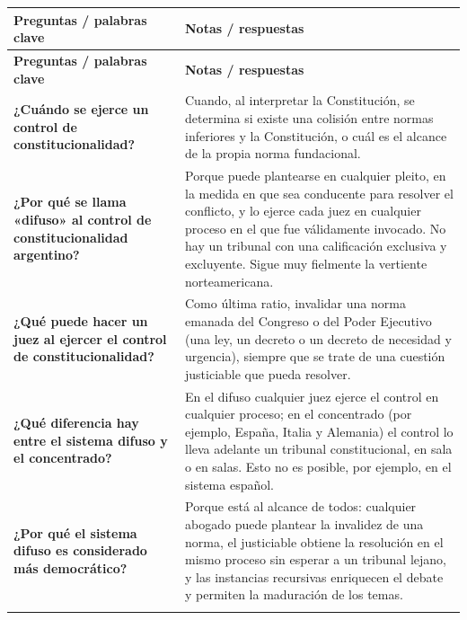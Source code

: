 \documentclass[12pt,oneside]{book}
\begin{document}
\begin{longtable}{@{}>{\RaggedRight\arraybackslash}p{}>{\RaggedRight\arraybackslash}p{}@{}}
\toprule
\textbf{Preguntas / palabras clave} & \textbf{Notas / respuestas} \\
\midrule
\endfirsthead
\toprule
\textbf{Preguntas / palabras clave} & \textbf{Notas / respuestas} \\
\midrule
\endhead
\bottomrule
\endlastfoot

\textbf{¿Cuándo se ejerce un control de constitucionalidad?} &
Cuando, al interpretar la Constitución, se determina si existe una colisión entre normas inferiores y la Constitución, o cuál es el alcance de la propia norma fundacional. \\
\addlinespace[0.3em]\cmidrule[0.2pt]{1-2}\addlinespace[0.3em]

\textbf{¿Por qué se llama «difuso» al control de constitucionalidad argentino?} &
Porque puede plantearse en cualquier pleito, en la medida en que sea conducente para resolver el conflicto, y lo ejerce cada juez en cualquier proceso en el que fue válidamente invocado. No hay un tribunal con una calificación exclusiva y excluyente. Sigue muy fielmente la vertiente norteamericana. \\
\addlinespace[0.3em]\cmidrule[0.2pt]{1-2}\addlinespace[0.3em]

\textbf{¿Qué puede hacer un juez al ejercer el control de constitucionalidad?} &
Como última ratio, invalidar una norma emanada del Congreso o del Poder Ejecutivo (una ley, un decreto o un decreto de necesidad y urgencia), siempre que se trate de una cuestión justiciable que pueda resolver. \\
\addlinespace[0.3em]\cmidrule[0.2pt]{1-2}\addlinespace[0.3em]

\textbf{¿Qué diferencia hay entre el sistema difuso y el concentrado?} &
En el difuso cualquier juez ejerce el control en cualquier proceso; en el concentrado (por ejemplo, España, Italia y Alemania) el control lo lleva adelante un tribunal constitucional, en sala o en salas. Esto no es posible, por ejemplo, en el sistema español. \\
\addlinespace[0.3em]\cmidrule[0.2pt]{1-2}\addlinespace[0.3em]

\textbf{¿Por qué el sistema difuso es considerado más democrático?} &
Porque está al alcance de todos: cualquier abogado puede plantear la invalidez de una norma, el justiciable obtiene la resolución en el mismo proceso sin esperar a un tribunal lejano, y las instancias recursivas enriquecen el debate y permiten la maduración de los temas. \\
\addlinespace[0.3em]\cmidrule[0.2pt]{1-2}\addlinespace[0.3em]


\end{longtable}
\end{document}
